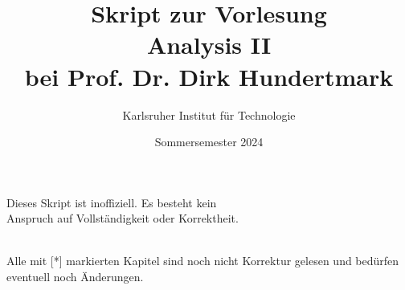 \documentclass[11pt, twoside, a4paper]{article}
\theoremstyle{plain}
\begin{document}
    \title{\vspace{3cm} Skript zur Vorlesung\\Analysis II\\bei Prof. Dr. Dirk Hundertmark}
    \author{Karlsruher Institut für Technologie}
    \date{Sommersemester 2024}
    \maketitle
    \begin{center}
        Dieses Skript ist inoffiziell. Es besteht kein\\ Anspruch auf Vollständigkeit oder Korrektheit.
    \end{center}
    \thispagestyle{empty}
    \newpage

    \tableofcontents
    ~\\
    Alle mit [*] markierten Kapitel sind noch nicht Korrektur gelesen und bedürfen eventuell noch Änderungen.

    \newpage
\end{document}
